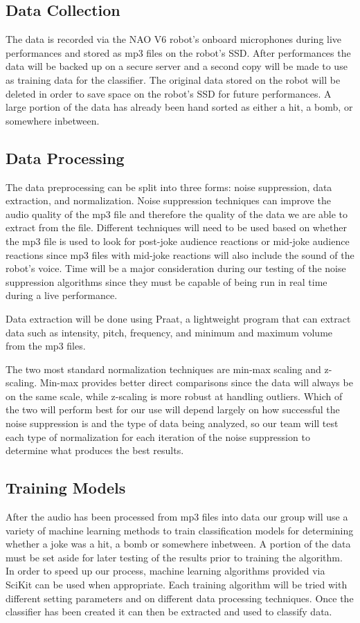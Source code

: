 \documentclass[onecolumn, draftclsnofoot,10pt, compsoc]{IEEEtran}
\begin{document}
\subsection{Data Collection}
The data is recorded via the NAO V6 robot's onboard microphones during live performances and stored as mp3 files on the robot's SSD. After performances the data will be backed up on a secure server and a second copy will be made to use as training data for the classifier. The original data stored on the robot will be deleted in order to save space on the robot's SSD for future performances. A large portion of the data has already been hand sorted as either a hit, a bomb, or somewhere inbetween.
\subsection{Data Processing}
The data preprocessing can be split into three forms: noise suppression, data extraction, and normalization. Noise suppression techniques can improve the audio quality of the mp3 file and therefore the quality of the data we are able to extract from the file. Different techniques will need to be used based on whether the mp3 file is used to look for post-joke audience reactions or mid-joke audience reactions since mp3 files with mid-joke reactions will also include the sound of the robot's voice. Time will be a major consideration during our testing of the noise suppression algorithms since they must be capable of being run in real time during a live performance.\par
\vspace{.3cm}
\noindent Data extraction will be done using Praat, a lightweight program that can extract data such as intensity, pitch, frequency, and minimum and maximum volume from the mp3 files.\par
\vspace{.3cm}
\noindent The two most standard normalization techniques are min-max scaling and z-scaling. Min-max provides better direct comparisons since the data will always be on the same scale, while z-scaling is more robust at handling outliers. Which of the two will perform best for our use will depend largely on how successful the noise suppression is and the type of data being analyzed, so our team will test each type of normalization for each iteration of the noise suppression to determine what produces the best results.
\subsection{Training Models}
After the audio has been processed from mp3 files into data our group will use a variety of machine learning methods to train classification models for determining whether a joke was a hit, a bomb or somewhere inbetween. A portion of the data must be set aside for later testing of the results prior to training the algorithm. In order to speed up our process, machine learning algorithms provided via SciKit can be used when appropriate. Each training algorithm will be tried with different setting parameters and on different data processing techniques. Once the classifier has been created it can then be extracted and used to classify data.
\end{document}
